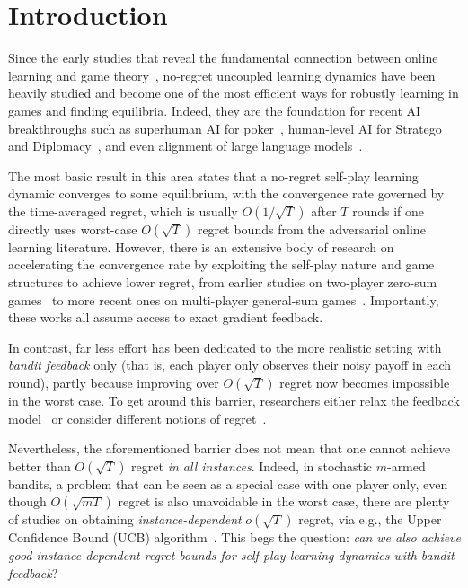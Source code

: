 \section{Introduction}

Since the early studies that reveal the fundamental connection between online learning and game theory~\citep{foster1997calibrated,freund1999adaptive,hart2000simple}, no-regret uncoupled learning dynamics have been heavily studied and become one of the most efficient ways for robustly learning in games and finding equilibria. 
Indeed, they are the foundation for recent AI breakthroughs such as superhuman AI for poker~\citep{bowling2015heads,moravvcik2017deepstack,brown2018superhuman,brown2019superhuman}, human-level AI for Stratego~\citep{perolat2022mastering} and Diplomacy~\citep{meta2022human}, and even alignment of large language models~\citep{jacob2023consensus,munos2024nash}.

The most basic result in this area states that a no-regret self-play learning dynamic converges to some equilibrium, with the convergence rate governed by the time-averaged regret, which is usually $O(1/\sqrt{T})$ after $T$ rounds if one directly uses worst-case $O(\sqrt{T})$ regret bounds from the adversarial online learning literature.
However, there is an extensive body of research on accelerating the convergence rate by exploiting the self-play nature and game structures to achieve lower regret, from earlier studies on two-player zero-sum games~\citep{daskalakis2011near,rakhlin2013optimization} to more recent ones on multi-player general-sum games~\citep{syrgkanis2015fast, chen2020hedging, daskalakis2021near-optimal, farina2022near, anagnostides2022uncoupled, anagnostides2022near-optimal}.
Importantly, these works all assume access to exact gradient feedback.

In contrast, far less effort has been dedicated to the more realistic setting with \emph{bandit feedback} only (that is, each player only observes their noisy payoff in each round), 
partly because improving over $O(\sqrt{T})$ regret now becomes impossible in the worst case.
To get around this barrier, researchers either relax the feedback model~\citep{rakhlin2013optimization,wei2018more} or consider different notions of regret~\citep{o2021matrix, maiti2023logarithmic}.

Nevertheless, the aforementioned barrier does not mean that one cannot achieve better than $O(\sqrt{T})$ regret \emph{in all instances}.
Indeed, in stochastic $m$-armed bandits, a problem that can be seen as a special case with one player only, even though $O(\sqrt{mT})$ regret is also unavoidable in the worst case, there are plenty of studies on obtaining \emph{instance-dependent} $o(\sqrt{T})$ regret, via e.g., the Upper Confidence Bound (UCB) algorithm~\citep{auer2002using}.
This begs the question: \emph{can we also achieve good instance-dependent regret bounds for self-play learning dynamics with bandit feedback}? 

